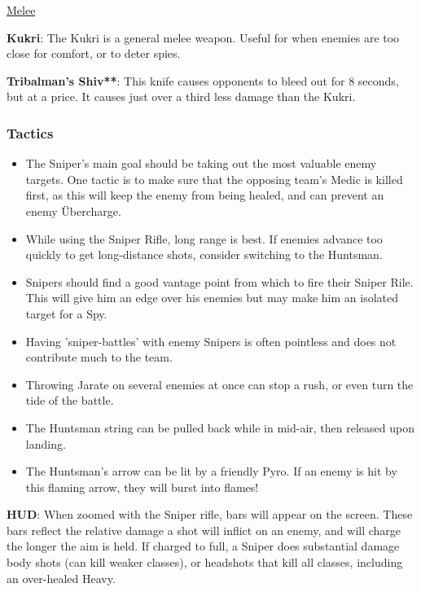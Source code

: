 \newpage

\begin {center}
\underline {Melee}
\end {center}

{\bf Kukri}: The Kukri is a general melee weapon. Useful for when enemies are too close for comfort, or to deter spies.

{\bf Tribalman's Shiv**}: This knife causes opponents to bleed out for 8 seconds, but at a price. It causes just over a third less damage than the Kukri.

\subsubsection {Tactics}
\begin {itemize}

\item The Sniper's main goal should be taking out the most valuable enemy targets. One tactic is to make sure that the opposing team's Medic is killed first, as this will keep the enemy from being healed, and can prevent an enemy Übercharge.

\item While using the Sniper Rifle, long range is best. If enemies advance too quickly to get long-distance shots, consider switching to the Huntsman.

\item Snipers should find a good vantage point from which to fire their Sniper Rile. This will give him an edge over his enemies but may make him an isolated target for a Spy.

\item Having 'sniper-battles' with enemy Snipers is often pointless and does not contribute much to the team.

\item Throwing Jarate on several enemies at once can stop a rush, or even turn the tide of the battle.

\item The Huntsman string can be pulled back while in mid-air, then released upon landing.

\item The Huntsman's arrow can be lit by a friendly Pyro. If an enemy is hit by this flaming arrow, they will burst into flames!
\end {itemize}

{\bf HUD}: When zoomed with the Sniper rifle, bars will appear on the screen. These bars reflect the relative damage a shot will inflict on an enemy, and will charge the longer the aim is held. If charged to full, a Sniper does substantial damage body shots (can kill weaker classes), or headshots that kill all classes, including an over-healed Heavy.